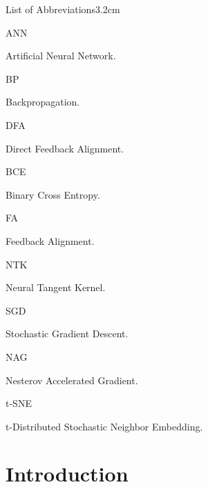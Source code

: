 \documentclass[a4paper, nobind]{templates/ociamthesis}
\begin{document}
\begin{romanpages}
\begin{mclistof}{List of Abbreviations}{3.2cm}
\item[ANN]

Artificial Neural Network.

\item[BP]

Backpropagation.

\item[DFA]

Direct Feedback Alignment.

\item[BCE]

Binary Cross Entropy.

\item[FA]

Feedback Alignment.

\item[NTK]

Neural Tangent Kernel.

\item[SGD]

Stochastic Gradient Descent.

\item[NAG]

Nesterov Accelerated Gradient.

\item[t-SNE]

t-Distributed Stochastic Neighbor Embedding.

\end{mclistof} 


\end{romanpages}

\flushbottom

\hypertarget{introduction}{%
\chapter*{Introduction}\label{introduction}}

\adjustmtc
{}
\end{document}
